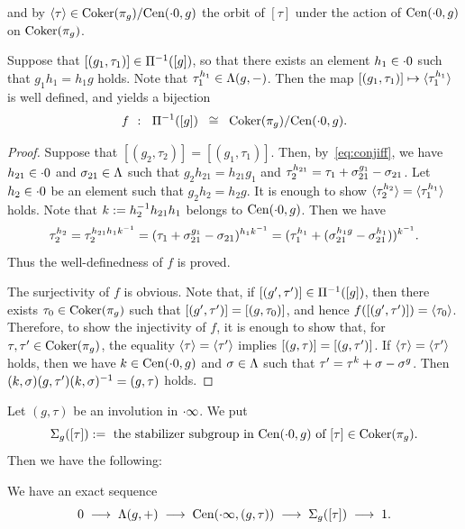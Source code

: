 \documentclass{amsart} %
\begin{document}
and by $\langle {\tau} \rangle\in  \operatorname{Coker}(\pi_{g})/\mathrm{Cen}(\cdot 0, g)$ the orbit of
$[\tau]$ under the action of  $\mathrm{Cen}(\cdot 0, g)$ on $ \operatorname{Coker}(\pi_{g})$.
%
%
\begin{proposition}\label{prop:bijf}
Suppose that  $[(g_1, \tau_1)]\in \Pi^{-1}([g])$,
so that there exists an element $h_1\in \cdot 0$
such that $g_1h_1=h_1 g $ holds.
Note that $\tau_1\sp{h_1}\in \Lambda(g, -)$.
Then the  map
$[(g_1, \tau_1)] \mapsto \langle {\tau_1\sp{h_1}} \rangle$ 
is well defined, and 
yields a bijection 
%
\begin{equation}\label{eq:Piinvg}
f\;\;\colon\;\; \Pi^{-1}([g])\;\;\cong\;\; \operatorname{Coker}(\pi_{g})/\mathrm{Cen}(\cdot 0, g).
\end{equation}
%
\end{proposition}
%
\begin{proof}
Suppose that $[(g_2, \tau_2)]=[(g_1, \tau_1)] $.
Then, by~\eqref{eq:conjiff},  we have $h_{21}\in \cdot 0$ and $\sigma_{21}\in \Lambda$ 
such that $g_2 h_{21}=h_{21} g_1$
and $\tau_2\sp{h_{21}}=\tau_1 +\sigma_{21}\sp{g_1}-\sigma_{21}$.
Let $h_2\in \cdot 0 $ be an element  
such that $g_2 h_2=h_2 g $.
It is enough to show 
$\langle {\tau_2^{ h_2}} \rangle=\langle {\tau_1^{h_1}} \rangle$ holds.
Note that $k:=h_2^{-1}  h_{21} h_1$ belongs to $\mathrm{Cen}(\cdot 0, g)$.
Then we have 
\[
\tau_2^{ h_2}=\tau_2^{ h_{21} h_1 k^{-1}}
=(\tau_1 +\sigma_{21}\sp{g_1}-\sigma_{21})^{ h_1 k^{-1}}
=(\tau_1\sp{  h_1}+(\sigma_{21}\sp{h_1 g}-\sigma_{21}\sp{h_1}))^{k^{-1}}.
\]
Thus the well-definedness of $f$ is proved.
\par
The surjectivity of $f$ is obvious.
Note that, if $[(g^{\prime}, \tau^{\prime})]\in \Pi^{-1}([g])$,
then there exists $\tau_0\in \operatorname{Coker}(\pi_{g})$ such that 
$[(g^{\prime}, \tau^{\prime})]=[(g, \tau_0)]$,  
and  hence
$f([(g^{\prime}, \tau^{\prime})])=\langle {\tau_0} \rangle$.
Therefore, to show the injectivity of $f$,
it is enough to show that, 
for $\tau, \tau^{\prime}\in \operatorname{Coker}(\pi_{g})$,
the equality $\langle {\tau} \rangle=\langle {\tau^{\prime}} \rangle$ implies 
$[(g, \tau)]=[(g, \tau^{\prime})]$.
If $\langle {\tau} \rangle=\langle {\tau^{\prime}} \rangle$ holds,
then we have $k\in \mathrm{Cen}(\cdot 0, g)$ and $\sigma\in \Lambda$
such that $\tau^{\prime}=\tau^k+\sigma-\sigma^g$.
Then $(k, \sigma)(g, \tau^{\prime})(k, \sigma)^{-1}=(g, \tau)$ holds.
%
\end{proof}
%
%
%
Let $(g, \tau)$ be an involution in $\cdot \infty$.
We put
\[
\Sigma_g([\tau]) :=
\textrm{ the stabilizer subgroup in $\mathrm{Cen}(\cdot 0, g)$ 
of $[\tau]\in  \operatorname{Coker}(\pi_{g})$}.
\]
Then we have the following:
%
\begin{proposition}\label{prop:exactCen}
We have an exact sequence 
%
\begin{equation}\label{eq:exactCen}
0 \;\longrightarrow\; \Lambda(g, +)\;\longrightarrow\; \mathrm{Cen}(\cdot \infty, (g, \tau)) 
\;\longrightarrow\;\Sigma_g([\tau]) \;\longrightarrow\; 1.
\end{equation}
%
\end{proposition}
\end{document}
